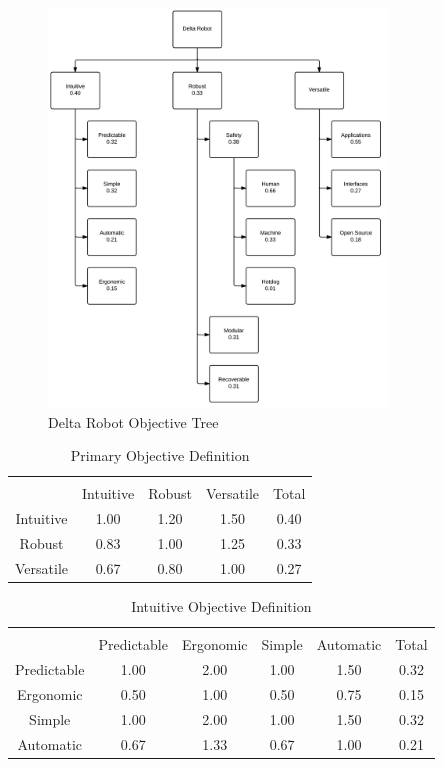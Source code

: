 \begin{figure}[h]
	\centering
	\includegraphics[width=0.8\textwidth]{objectivetree.png}
	\caption{Delta Robot Objective Tree}
	\label{fig:objectivetree}
\end{figure}

\begin{table}[ht] 
	\caption{Primary Objective Definition}
	\label{table:primary}
	\centering 
	\begin{tabular}{c c c c c} 
		\hline\hline \\
		 			& Intuitive 	& Robust 		& Versatile 	& Total\\ 
		Intuitive 	& 1.00 		& 1.20 		& 1.50 		& 0.40 \\ 
		Robust 		& 0.83 		& 1.00 		& 1.25		& 0.33 \\ 
		Versatile 	& 0.67 		& 0.80 		& 1.00 		& 0.27 \\ 
	\end{tabular} 
\end{table}

\begin{table}[ht] 
	\caption{Intuitive Objective Definition}
	\label{table:intuitive}
	\centering 
	\begin{tabular}{c c c c c c} 
		\hline\hline \\
		 			& Predictable	& Ergonomic	& Simple 		& Automatic 	& Total\\ 
		Predictable 	& 1.00 		& 2.00 		& 1.00 		& 1.50 		& 0.32 \\ 
		Ergonomic		& 0.50 		& 1.00 		& 0.50		& 0.75 		& 0.15 \\ 
		Simple	 	& 1.00 		& 2.00 		& 1.00 		& 1.50 		& 0.32 \\ 
		Automatic	 	& 0.67		& 1.33 		& 0.67 		& 1.00 		& 0.21 \\ 
	\end{tabular} 
\end{table}

